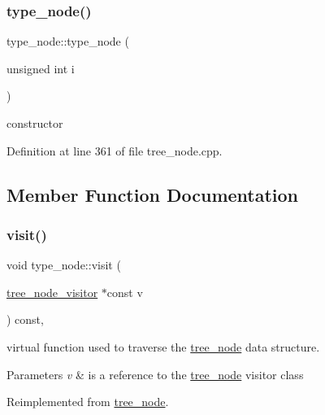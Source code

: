 \subsubsection{\texorpdfstring{type\+\_\+node()}{type\_node()}}
{\footnotesize\ttfamily type\+\_\+node\+::type\+\_\+node (\begin{DoxyParamCaption}\item[{unsigned int}]{i }\end{DoxyParamCaption})\hspace{0.3cm}{\ttfamily [explicit]}}



constructor 



Definition at line 361 of file tree\+\_\+node.\+cpp.



\subsection{Member Function Documentation}
\mbox{\label{structtype__node_adc6e447af5f9505e6305320933c46a96}} 
\subsubsection{\texorpdfstring{visit()}{visit()}}
{\footnotesize\ttfamily void type\+\_\+node\+::visit (\begin{DoxyParamCaption}\item[{\hyperlink{classtree__node__visitor}{tree\+\_\+node\+\_\+visitor} $\ast$const}]{v }\end{DoxyParamCaption}) const\hspace{0.3cm}{\ttfamily [override]}, {\ttfamily [virtual]}}



virtual function used to traverse the \hyperlink{classtree__node}{tree\+\_\+node} data structure. 


\begin{DoxyParams}{Parameters}
{\em v} & is a reference to the \hyperlink{classtree__node}{tree\+\_\+node} visitor class \\
\hline
\end{DoxyParams}


Reimplemented from \hyperlink{classtree__node_aa9abba3f1b30e0be80b4a56b188c6ecc}{tree\+\_\+node}.



